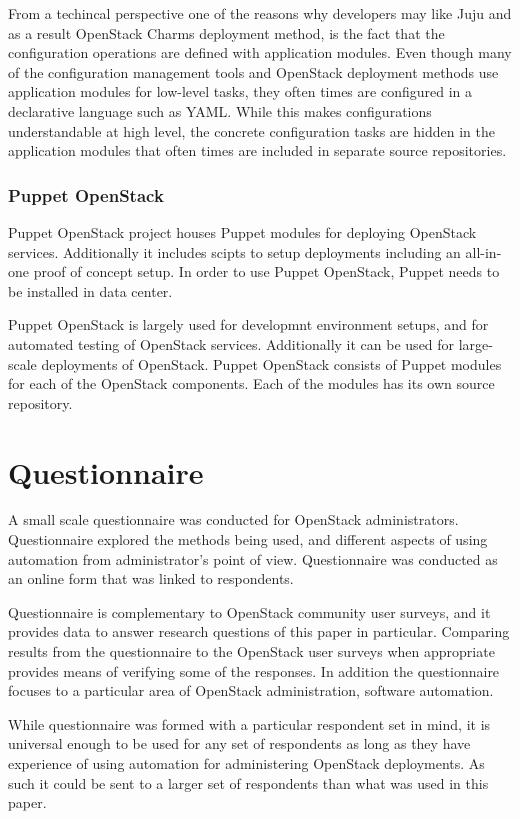 \documentclass[officiallayout]{tktla}
\begin{document}
From a techincal perspective one of the reasons why developers may like Juju
and as a result OpenStack Charms deployment method, is the fact that the
configuration operations are defined with application modules. Even though many
of the configuration management tools and OpenStack deployment methods use
application modules for low-level tasks, they often times are configured in a
declarative language such as YAML. While this makes configurations
understandable at high level, the concrete configuration tasks are hidden in
the application modules that often times are included in separate source
repositories.

\subsection{Puppet OpenStack}

Puppet OpenStack project houses Puppet \cite{puppet-deployment-guide} modules
for deploying OpenStack services. Additionally it includes scipts to setup
deployments including an all-in-one proof of concept setup. In order to use
Puppet OpenStack, Puppet needs to be installed in data center.

Puppet OpenStack is largely used for developmnt environment setups, and for
automated testing of OpenStack services. Additionally it can be used for
large-scale deployments of OpenStack. Puppet OpenStack consists of Puppet
modules for each of the OpenStack components. Each of the modules has its own
source repository.

\chapter{Questionnaire}

A small scale questionnaire was conducted for OpenStack administrators.
Questionnaire explored the methods being used, and different aspects of using
automation from administrator's point of view. Questionnaire was conducted as
an online form that was linked to respondents.

Questionnaire is complementary to OpenStack community user surveys, and it
provides data to answer research questions of this paper in particular.
Comparing results from the questionnaire to the OpenStack user surveys when
appropriate provides means of verifying some of the responses. In addition the
questionnaire focuses to a particular area of OpenStack administration,
software automation.

While questionnaire was formed with a particular respondent set in mind, it is
universal enough to be used for any set of respondents as long as they have
experience of using automation for administering OpenStack deployments. As such
it could be sent to a larger set of respondents than what was used in this
paper.
\end{document}
